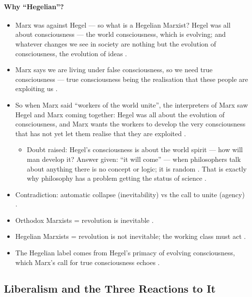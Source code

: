 \paragraph{Why ``Hegelian''?}
\begin{itemize}
    \item Marx was against Hegel --- so what is a Hegelian Marxist? Hegel was all about consciousness --- the world consciousness, which is evolving; and whatever changes we see in society are nothing but the evolution of consciousness, the evolution of ideas .
    \item Marx says we are living under false consciousness, so we need true consciousness --- true consciousness being the realisation that these people are exploiting us .
    \item So when Marx said ``workers of the world unite'', the interpreters of Marx saw Hegel and Marx coming together: Hegel was all about the evolution of consciousness, and Marx wants the workers to develop the very consciousness that has not yet let them realise that they are exploited .
    \begin{itemize}
        \item Doubt raised: Hegel's consciousness is about the world spirit --- how will man develop it? Answer given: ``it will come'' --- when philosophers talk about anything there is no concept or logic; it is random . That is exactly why philosophy has a problem getting the status of science .
    \end{itemize}
\end{itemize}

\begin{QuickRevision}
\begin{itemize}
    \item Contradiction: automatic collapse (inevitability) vs the call to unite (agency) .
    \item Orthodox Marxists = revolution is inevitable .
    \item Hegelian Marxists = revolution is not inevitable; the working class must act .
    \item The Hegelian label comes from Hegel's primacy of evolving consciousness, which Marx's call for true consciousness echoes .
\end{itemize}
\end{QuickRevision}

\subsection{Liberalism and the Three Reactions to It}

